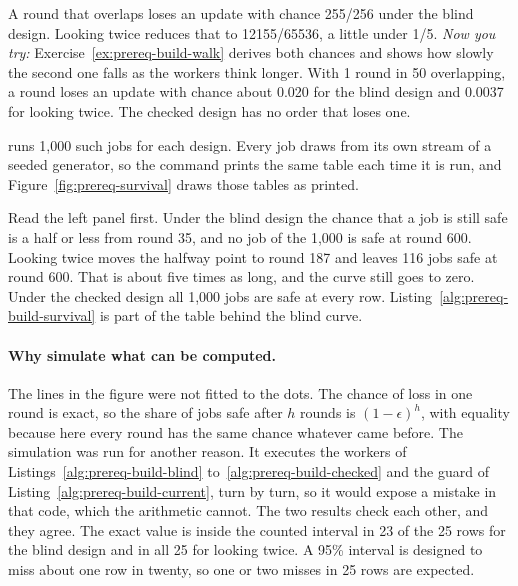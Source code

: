 
A round that overlaps loses an update with chance 255/256 under the blind
design. Looking twice reduces that to 12155/65536, a little under 1/5.
\emph{Now you try:} Exercise~\ref{ex:prereq-build-walk} derives both
chances and shows how slowly the second one falls as the workers think
longer. With 1 round in 50 overlapping, a round loses an update with chance
about 0.020 for the blind design and 0.0037 for looking twice. The checked
design has no order that loses one.

\pdkernelname{} runs 1,000 such jobs for each design. Every job draws from
its own stream of a seeded generator, so the command prints the same table
each time it is run, and Figure~\ref{fig:prereq-survival} draws those
tables as printed.



Read the left panel first. Under the blind design the chance that a job is
still safe is a half or less from round 35, and no job of the 1,000 is safe
at round 600. Looking twice moves the halfway point to round 187 and leaves
116 jobs safe at round 600. That is about five times as long, and the curve
still goes to zero. Under the checked design all 1,000 jobs are safe at
every row. Listing~\ref{alg:prereq-build-survival} is part of the table
behind the blind curve.


\paragraph{Why simulate what can be computed.}
The lines in the figure were not fitted to the dots. The chance of loss in
one round is exact, so the share of jobs safe after $h$ rounds is
$(1-\epsilon)^h$, with equality because here every round has the same
chance whatever came before. The simulation was run for another reason. It
executes the workers of Listings~\ref{alg:prereq-build-blind}
to~\ref{alg:prereq-build-checked} and the guard of
Listing~\ref{alg:prereq-build-current}, turn by turn, so it would expose a
mistake in that code, which the arithmetic cannot. The two results check
each other, and they agree. The exact value is inside the counted interval
in 23 of the 25 rows for the blind design and in all 25 for looking twice.
A 95\% interval is designed to miss about one row in twenty, so one or two
misses in 25 rows are expected.

